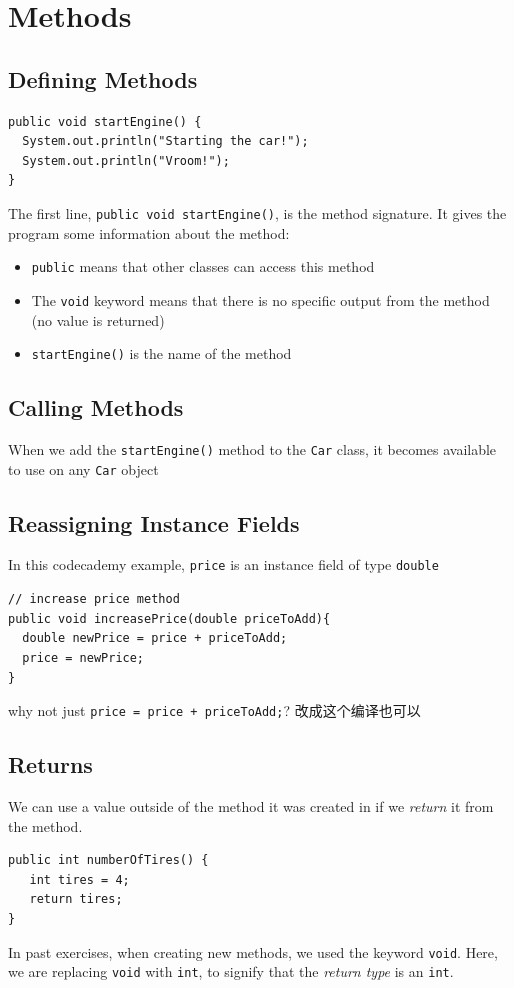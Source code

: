 \documentclass[a4paper, 12pt]{article}
\begin{document}
\section{Methods}
\subsection{Defining Methods}
\begin{verbatim}
public void startEngine() {
  System.out.println("Starting the car!");
  System.out.println("Vroom!");
}
\end{verbatim}
The first line, \verb|public void startEngine()|, is the method signature. It gives the program some information about the method:
\begin{itemize}
\item \verb|public| means that other classes can access this method

\item The \verb|void| keyword means that there is no specific output from the method (no value is returned)

\item \verb|startEngine()| is the name of the method

\end{itemize}

\subsection{Calling Methods}
When we add the \verb|startEngine()| method to the \verb|Car| class, it becomes available to use on any \verb|Car| object

\subsection{Reassigning Instance Fields}
In this codecademy example, \verb|price| is an instance field of type \verb|double|
\begin{verbatim}
// increase price method
public void increasePrice(double priceToAdd){
  double newPrice = price + priceToAdd;
  price = newPrice;
}
\end{verbatim}
why not just \verb|price = price + priceToAdd;|? 改成这个编译也可以

\subsection{Returns}
We can use a value outside of the method it was created in if we \textit{return} it from the method.
\begin{verbatim}
public int numberOfTires() {
   int tires = 4;
   return tires;
}
\end{verbatim}
In past exercises, when creating new methods, we used the keyword \verb|void|. Here, we are replacing \verb|void| with \verb|int|, to signify that the \textit{return type} is an \verb|int|.
\end{document}
